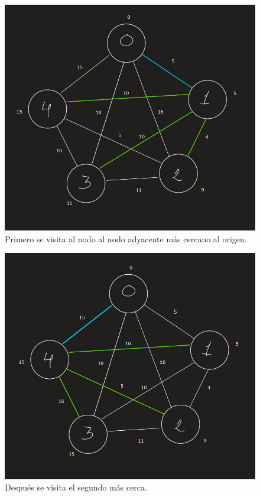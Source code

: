 \documentclass[11pt]{article}
\begin{document}
\begin{figure}[!htbp]
\centering
\includegraphics[scale = .5]{grafos2}
\caption{Primero se visita al nodo al nodo adyacente más cercano al origen.}
\end{figure}


\begin{figure}[!htbp]
\centering
\includegraphics[scale = .5]{grafos3}
\caption{Después se visita el segundo más cerca.}
\end{figure}
\end{document}

